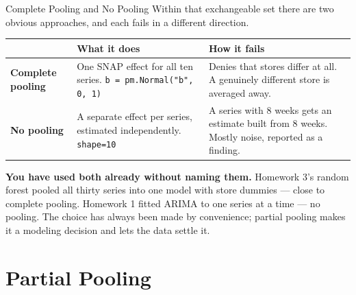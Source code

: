 \documentclass[aspectratio=169, 11pt]{beamer}
\begin{document}
\begin{frame}{Complete Pooling and No Pooling}
  Within that exchangeable set there are two obvious approaches, and each fails in a different
  direction.
  \begin{center}
    {\small
    \begin{tabular}{p{3.0cm}p{4.4cm}p{4.9cm}}
      \toprule
      & \textbf{What it does} & \textbf{How it fails} \\
      \midrule
      \textbf{Complete pooling} & One SNAP effect for all ten series. \newline
      \texttt{b = pm.Normal("b", 0, 1)} & Denies that stores differ at all. A genuinely
      different store is averaged away. \\[3pt]
      \textbf{No pooling} & A separate effect per series, estimated independently. \newline
      \texttt{shape=10} & A series with 8 weeks gets an estimate built from 8 weeks. Mostly
      noise, reported as a finding. \\
      \bottomrule
    \end{tabular}
    }
  \end{center}

  \vspace{0.05cm}
  \textbf{You have used both already without naming them.} Homework 3's random forest pooled all
  thirty series into one model with store dummies --- close to complete pooling. Homework 1
  fitted ARIMA to one series at a time --- no pooling. The choice has always been made by
  convenience; partial pooling makes it a modeling decision and lets the data settle it.
\end{frame}

\section{Partial Pooling}

\end{document}
